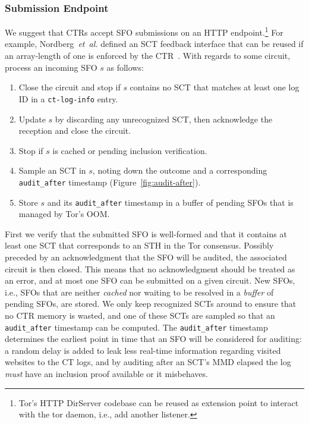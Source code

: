 \subsubsection{Submission Endpoint} \label{sec:design:api}
We suggest that CTRs accept SFO submissions on an HTTP endpoint.\footnote{%
	Tor's HTTP DirServer codebase can be reused as extension point to interact
	with the tor daemon, i.e., add another listener.
} For example, Nordberg~\emph{et~al.} defined an SCT feedback interface that can
be reused if an array-length of one is enforced by the CTR~\cite{nordberg}.
With regards to some circuit, process an incoming SFO $s$ as follows:
\begin{enumerate}
	\item\label{enm:ctr-api:well-formed} Close the circuit and stop if $s$
		contains no SCT that matches at least one log ID in a
	\texttt{ct-log-info} entry.
	\item\label{enm:ctr-api:ack} Update $s$ by discarding any
		unrecognized SCT, %
		then acknowledge the reception and close the circuit.
	\item\label{enm:ctr-api:cached}
		Stop if $s$ is cached or pending inclusion verification.
	\item\label{enm:ctr-api:audit-after} Sample an SCT in $s$, noting down the
		outcome and a corresponding \texttt{audit\_after} timestamp
		(Figure~\ref{fig:audit-after}).
	\item\label{enm:ctr-api:store} Store $s$ and its \texttt{audit\_after}
		timestamp in a buffer of pending SFOs that is managed by Tor's OOM.
\end{enumerate}

First we verify that the submitted SFO is well-formed and that it contains at
least one SCT that corresponds to an STH in the Tor consensus.
Possibly preceded by an acknowledgment that the SFO will be audited, the
associated circuit is then closed.  This means that no acknowledgment should be
treated as an error, and at most one SFO can be submitted on a given circuit.
New SFOs, i.e., SFOs that are neither \emph{cached} nor waiting to be resolved
in a \emph{buffer} of pending SFOs, are stored.  We only keep recognized
SCTs around to ensure that no CTR memory is wasted, and one of these SCTs are
sampled so that an \texttt{audit\_after} timestamp can be computed.  The
\texttt{audit\_after} timestamp determines the earliest point in time that an
SFO will be considered for auditing:
	a random delay is added to leak less real-time information regarding visited
		websites to the CT logs, and
	by auditing after an SCT's MMD elapsed the log \emph{must} have an
		inclusion proof available or it misbehaves.

